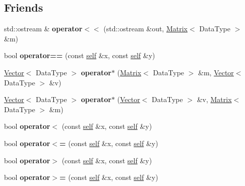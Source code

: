 \subsection*{Friends}
\begin{DoxyCompactItemize}
\item 
\mbox{\label{classez_1_1maths_1_1Matrix_a0f01ab4d11317fc6cdd4af4f049e2727}} 
std\+::ostream \& {\bfseries operator$<$$<$} (std\+::ostream \&out, \hyperlink{classez_1_1maths_1_1Matrix}{Matrix}$<$ Data\+Type $>$ \&m)
\item 
\mbox{\label{classez_1_1maths_1_1Matrix_a89b571e0607100045577d5023a77342b}} 
bool {\bfseries operator==} (const \hyperlink{classez_1_1maths_1_1Matrix}{self} \&x, const \hyperlink{classez_1_1maths_1_1Matrix}{self} \&y)
\item 
\mbox{\label{classez_1_1maths_1_1Matrix_a7b7b1149640de716ebef2e91527b695f}} 
\hyperlink{classez_1_1maths_1_1Vector}{Vector}$<$ Data\+Type $>$ {\bfseries operator$\ast$} (\hyperlink{classez_1_1maths_1_1Matrix}{Matrix}$<$ Data\+Type $>$ \&m, \hyperlink{classez_1_1maths_1_1Vector}{Vector}$<$ Data\+Type $>$ \&v)
\item 
\mbox{\label{classez_1_1maths_1_1Matrix_ada11ca1e5476b320d044ea2b94431ded}} 
\hyperlink{classez_1_1maths_1_1Vector}{Vector}$<$ Data\+Type $>$ {\bfseries operator$\ast$} (\hyperlink{classez_1_1maths_1_1Vector}{Vector}$<$ Data\+Type $>$ \&v, \hyperlink{classez_1_1maths_1_1Matrix}{Matrix}$<$ Data\+Type $>$ \&m)
\item 
\mbox{\label{classez_1_1maths_1_1Matrix_a4eda110f2ff2f92546170cbc4a198e05}} 
bool {\bfseries operator$<$} (const \hyperlink{classez_1_1maths_1_1Matrix}{self} \&x, const \hyperlink{classez_1_1maths_1_1Matrix}{self} \&y)
\item 
\mbox{\label{classez_1_1maths_1_1Matrix_a9e89bf77c37246bc1e7c1b9f59a5e369}} 
bool {\bfseries operator$<$=} (const \hyperlink{classez_1_1maths_1_1Matrix}{self} \&x, const \hyperlink{classez_1_1maths_1_1Matrix}{self} \&y)
\item 
\mbox{\label{classez_1_1maths_1_1Matrix_ae1705ad5d782614d851e1553f15f017b}} 
bool {\bfseries operator$>$} (const \hyperlink{classez_1_1maths_1_1Matrix}{self} \&x, const \hyperlink{classez_1_1maths_1_1Matrix}{self} \&y)
\item 
\mbox{\label{classez_1_1maths_1_1Matrix_a79ad47b0999178d78909e91cd6a50109}} 
bool {\bfseries operator$>$=} (const \hyperlink{classez_1_1maths_1_1Matrix}{self} \&x, const \hyperlink{classez_1_1maths_1_1Matrix}{self} \&y)
\end{DoxyCompactItemize}


